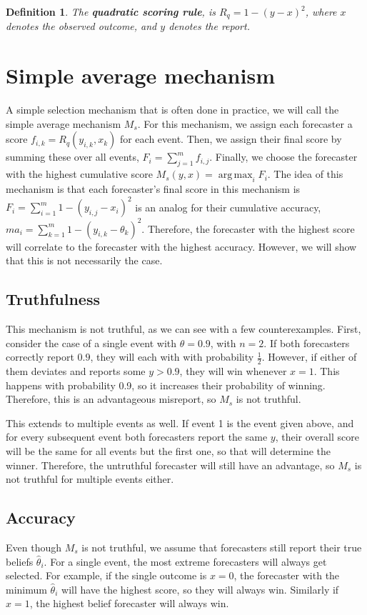 \documentclass[letterpaper,12pt]{article}
\DeclareMathOperator*{\argmax}{arg\,max}
\newcommand{\1}{\mathbbm{1}}
\newtheorem{definition}[theorem]{Definition}
\begin{document}
\begin{definition}
  \label{quadratic_scoring_rule}
  The \textbf{quadratic scoring rule}, is $R_q = 1 - (y - x)^2$, where $x$ denotes the observed outcome, and $y$ denotes the report.
\end{definition}

\section{Simple average mechanism}
A simple selection mechanism that is often done in practice, we will call the simple average mechanism $M_s$. For this mechanism, we assign each forecaster a score $f_{i, k} = R_q(y_{i, k}, x_k)$ for each event. Then, we assign their final score by summing these over all events, $F_i = \sum_{j=1}^m f_{i, j}$. Finally, we choose the forecaster with the highest cumulative score $M_s(y, x) = \argmax_i F_i$. The idea of this mechanism is that each forecaster's final score in this mechanism is $F_i = \sum_{i=1}^m 1 - (y_{i, j} - x_i)^2$ is an analog for their cumulative accuracy, $m a_i = \sum_{k=1}^m 1 - (y_{i, k} - \theta_k)^2$. Therefore, the forecaster with the highest score will correlate to the forecaster with the highest accuracy. However, we will show that this is not necessarily the case. 

\subsection{Truthfulness}
This mechanism is not truthful, as we can see with a few counterexamples. First, consider the case of a single event with $\theta = 0.9$, with $n = 2$. If both forecasters correctly report $0.9$, they will each with with probability $\frac{1}{2}$. However, if either of them deviates and reports some $y > 0.9$, they will win whenever $x = 1$. This happens with probability 0.9, so it increases their probability of winning. Therefore, this is an advantageous misreport, so $M_s$ is not truthful. 

This extends to multiple events as well. If event 1 is the event given above, and for every subsequent event both forecasters report the same $y$, their overall score will be the same for all events but the first one, so that will determine the winner. Therefore, the untruthful forecaster will still have an advantage, so $M_s$ is not truthful for multiple events either. 

\subsection{Accuracy}
Even though $M_s$ is not truthful, we assume that forecasters still report their true beliefs $\hat \theta_i$. For a single event, the most extreme forecasters will always get selected. For example, if the single outcome is $x = 0$, the forecaster with the minimum $\hat \theta_i $ will have the highest score, so they will always win. Similarly if $x = 1$, the highest belief forecaster will always win. 
\end{document}
